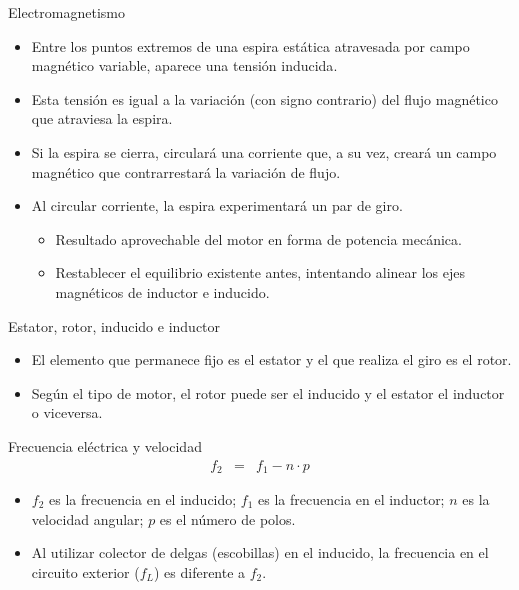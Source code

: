 \documentclass[xcolor={usenames,svgnames,dvipsnames}]{beamer}
\begin{document}
\begin{frame}[label=sec-2-1-2]{Electromagnetismo}
\begin{itemize}
\item Entre los puntos extremos de una \alert{espira} estática atravesada por \alert{campo magnético variable}, aparece una \alert{tensión inducida}.

\item Esta tensión es igual a la \alert{variación} (con signo contrario) \alert{del flujo magnético} que atraviesa la espira.

\item Si la espira se cierra, \alert{circulará una corriente} que, a su vez, creará un campo magnético que contrarrestará la variación de flujo.

\item Al circular corriente, la espira experimentará un \alert{par de giro}.

\begin{itemize}
\item \alert{Resultado aprovechable} del motor en forma de potencia mecánica.

\item Restablecer el equilibrio existente antes, intentando \alert{alinear los ejes magnéticos de inductor e inducido}.
\end{itemize}
\end{itemize}
\end{frame}



\begin{frame}[label=sec-2-1-3]{Estator, rotor, inducido e inductor}
\begin{itemize}
\item El elemento que permanece fijo es el estator y el que realiza el giro es el rotor.

\item Según el tipo de motor, el rotor puede ser el inducido y el estator el inductor o viceversa.
\end{itemize}
\end{frame}


\begin{frame}[label=sec-2-1-4]{Frecuencia eléctrica y velocidad}
$$\begin{aligned}
f_{2} & = & f_{1}-n\cdot p\end{aligned}$$

\begin{itemize}
\item $f_{2}$ es la frecuencia en el inducido; $f_{1}$ es la frecuencia en el inductor; $n$ es la velocidad angular; $p$ es el número de polos.

\item Al utilizar colector de delgas (escobillas) en el inducido, la frecuencia en el circuito exterior ($f_{L}$) es diferente a $f_{2}$.
\end{itemize}
\end{frame}
\end{document}
